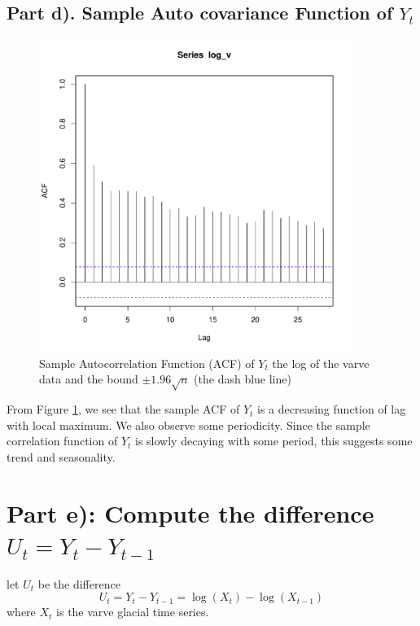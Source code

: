 \documentclass[11pt, oneside]{article}   	%
\begin{document}
\subsection{Part d). Sample Auto covariance Function of $Y_{t}$}
\begin{figure}[H] %
   \centering
   \includegraphics[width=4in]{acf} 
   \caption{Sample Autocorrelation Function (ACF) of $Y_{t}$ the log of the varve data and the bound $\pm 1.96\sqrt{n}$ (the dash blue line)}
   \label{fig:acf}
\end{figure}
From Figure \ref{fig:acf}, we see that the sample ACF of $Y_{t}$ is a decreasing function of lag with local maximum. We also observe some periodicity. Since the sample correlation function of $Y_{t}$ is slowly decaying with some period, this suggests some trend and seasonality.


\section{Part e): Compute the difference $U_{t} = Y_{t}-Y_{t-1}$}
let $U_{t}$ be the difference
\begin{equation}\label{eq:diff}
U_{t} = Y_{t}-Y_{t-1} = \log(X_{t}) - \log(X_{t-1})
\end{equation}
where $X_{t}$ is the varve glacial time series.
\end{document}
